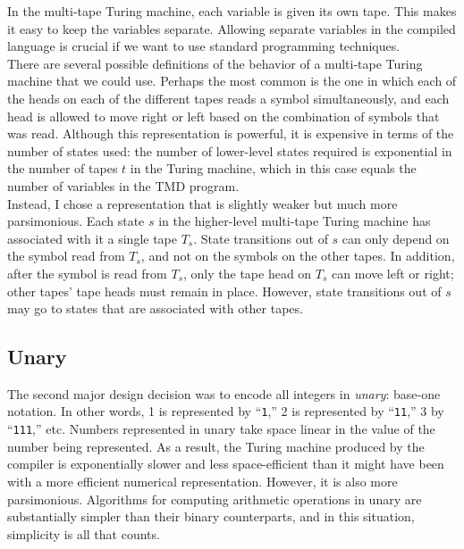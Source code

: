 \documentclass[11pt]{report}
\begin{document}
In the multi-tape Turing machine, each variable is given its own tape. This makes it easy to keep the variables separate. Allowing separate variables in the compiled language is crucial if we want to use standard programming techniques. \\

There are several possible definitions of the behavior of a multi-tape Turing machine that we could use. Perhaps the most common is the one in which each of the heads on each of the different tapes reads a symbol simultaneously, and each head is allowed to move right or left based on the combination of symbols that was read. Although this representation is powerful, it is expensive in terms of the number of states used: the number of lower-level states required is exponential in the number of tapes $t$ in the Turing machine, which in this case equals the number of variables in the TMD program. \\

Instead, I chose a representation that is slightly weaker but much more parsimonious. Each state $s$ in the higher-level multi-tape Turing machine has associated with it a single tape $T_s$. State transitions out of $s$ can only depend on the symbol read from $T_s$, and not on the symbols on the other tapes. In addition, after the symbol is read from $T_s$, only the tape head on $T_s$ can move left or right; other tapes' tape heads must remain in place. However, state transitions out of $s$ may go to states that are associated with other tapes. 

\subsection{Unary}

The second major design decision was to encode all integers in \emph{unary}: base-one notation. In other words, 1 is represented by ``\texttt{1},'' 2 is represented by ``\texttt{11},'' 3 by ``\texttt{111},'' etc. Numbers represented in unary take space linear in the value of the number being represented. As a result, the Turing machine produced by the compiler is exponentially slower and less space-efficient than it might have been with a more efficient numerical representation. However, it is also more parsimonious. Algorithms for computing arithmetic operations in unary are substantially simpler than their binary counterparts, and in this situation, simplicity is all that counts. \\
\end{document}
